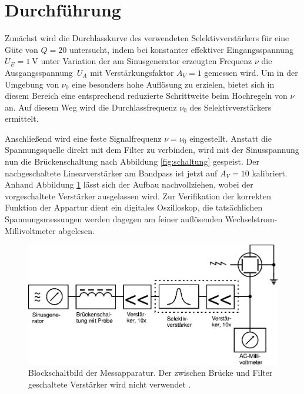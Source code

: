 \section{Durchführung}
\label{sec:durchführung}

Zunächst wird die Durchlasskurve des verwendeten Selektivverstärkers für eine Güte von $Q = 20$ untersucht, indem bei konstanter
effektiver Eingangsspannung $U_E = \qty{1}{\volt}$ unter Variation der am Sinusgenerator erzeugten Frequenz $\nu$ die
Ausgangsspannung~$U_{\! A}$ mit Verstärkungsfaktor $A_V = 1$ gemessen wird. Um in der Umgebung von $\nu_0$ eine besonders hohe
Auflösung zu erzielen, bietet sich in diesem Bereich eine entsprechend reduzierte Schrittweite beim Hochregeln von $\nu$ an.
Auf diesem Weg wird die Durchlassfrequenz $\nu_0$ des Selektivverstärkers ermittelt.

Anschließend wird eine feste Signalfrequenz $\nu = \nu_0$ eingestellt. Anstatt die Spannungsquelle direkt mit dem Filter zu verbinden,
wird mit der Sinusspannung nun die Brückenschaltung nach Abbildung \ref{fig:schaltung} gespeist. Der nachgeschaltete Linearverstärker
am Bandpass ist jetzt auf $A_V = 10$ kalibriert. Anhand Abbildung \ref{fig:schaltbild} lässt sich der Aufbau nachvollziehen, wobei der
vorgeschaltete Verstärker ausgelassen wird. Zur Verifikation der korrekten Funktion der Appartur dient ein digitales Oszilloskop, die
tatsächlichen Spannungsmessungen werden dagegen am feiner auflösenden Wechselstrom-Millivoltmeter abgelesen. 

\begin{figure}[H]
	\centering
	\includegraphics[width=1\linewidth]{content/grafik/schaltbild.pdf}
	\caption{Blockschaltbild der Messapparatur. Der zwischen Brücke und Filter geschaltete Verstärker
			 wird nicht verwendet \cite{paramagnet}.}
	\label{fig:schaltbild}
\end{figure}

